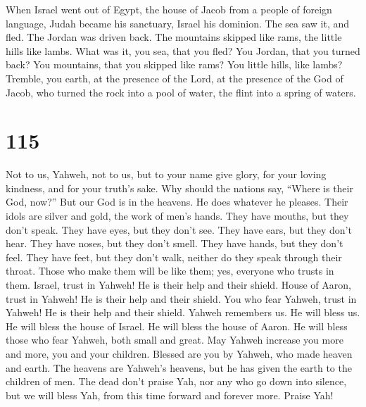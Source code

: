  When Israel went out of Egypt, the house of Jacob from a
people of foreign language,  Judah became his sanctuary,
Israel his dominion.  The sea saw it, and fled. The Jordan
was driven back.  The mountains skipped like rams, the
little hills like lambs.  What was it, you sea, that you
fled? You Jordan, that you turned back?  You mountains,
that you skipped like rams? You little hills, like lambs? 
Tremble, you earth, at the presence of the Lord, at the presence of the
God of Jacob,  who turned the rock into a pool of water,
the flint into a spring of waters.

\hypertarget{section-114}{%
\section{115}\label{section-114}}

 Not to us, Yahweh, not to us, but to your name give
glory, for your loving kindness, and for your truth's sake.
 Why should the nations say, ``Where is their God, now?''
 But our God is in the heavens. He does whatever he
pleases.  Their idols are silver and gold, the work of
men's hands.  They have mouths, but they don't speak. They
have eyes, but they don't see.  They have ears, but they
don't hear. They have noses, but they don't smell.  They
have hands, but they don't feel. They have feet, but they don't walk,
neither do they speak through their throat.  Those who
make them will be like them; yes, everyone who trusts in them.
 Israel, trust in Yahweh! He is their help and their
shield.  House of Aaron, trust in Yahweh! He is their
help and their shield.  You who fear Yahweh, trust in
Yahweh! He is their help and their shield.  Yahweh
remembers us. He will bless us. He will bless the house of Israel. He
will bless the house of Aaron.  He will bless those who
fear Yahweh, both small and great.  May Yahweh increase
you more and more, you and your children.  Blessed are
you by Yahweh, who made heaven and earth.  The heavens
are Yahweh's heavens, but he has given the earth to the children of men.
 The dead don't praise Yah, nor any who go down into
silence,  but we will bless Yah, from this time forward
and forever more. Praise Yah!

